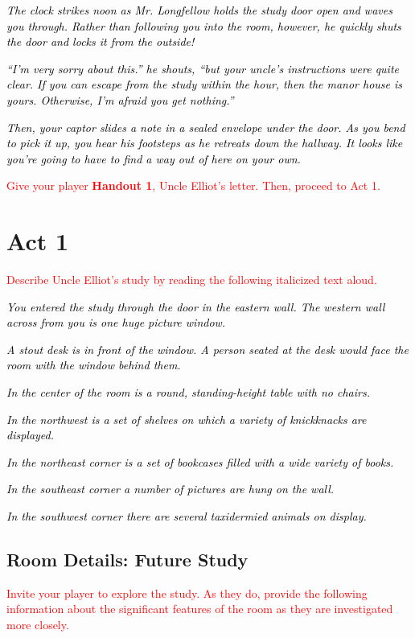 \documentclass[a6paper, parskip=half, DIV=14, 12pt]{scrartcl}
\begin{document}
\textcolor{black}{\textit{The clock strikes noon as Mr. Longfellow holds the study door open and waves you through. Rather than following you into the room, however, he quickly shuts the door and locks it from the outside!}}

\textcolor{black}{\textit{``I'm very sorry about this.'' he shouts, ``but your uncle's instructions were quite clear. If you can escape from the study within the hour, then the manor house is yours. Otherwise, I'm afraid you get nothing.''}}

\textcolor{black}{\textit{Then, your captor slides a note in a sealed envelope under the door. As you bend to pick it up, you hear his footsteps as he retreats down the hallway. It looks like you're going to have to find a way out of here on your own.}}

\textcolor{Red}{Give your player \textbf{Handout 1}, Uncle Elliot's letter. Then, proceed to Act 1.}

\newpage

\section*{Act 1}
\textcolor{Red}{Describe Uncle Elliot's study by reading the following italicized text aloud.}

\textcolor{black}{\textit{You entered the study through the door in the eastern wall. The western wall across from you is one huge picture window.}}

\textcolor{black}{\textit{A stout desk is in front of the window. A person seated at the desk would face the room with the window behind them.}}

\textcolor{black}{\textit{In the center of the room is a round, standing-height table with no chairs.}}

\textcolor{black}{\textit{In the northwest is a set of shelves on which a variety of knickknacks are displayed.}}

\textcolor{black}{\textit{In the northeast corner is a set of bookcases filled with a wide variety of books.}}

\textcolor{black}{\textit{In the southeast corner a number of pictures are hung on the wall.}}

\textcolor{black}{\textit{In the southwest corner there are several taxidermied animals on display.}}

\newpage

\subsection*{Room Details: Future Study}
\textcolor{Red}{Invite your player to explore the study. As they do, provide the following information about the significant features of the room as they are investigated more closely.}
\end{document}
